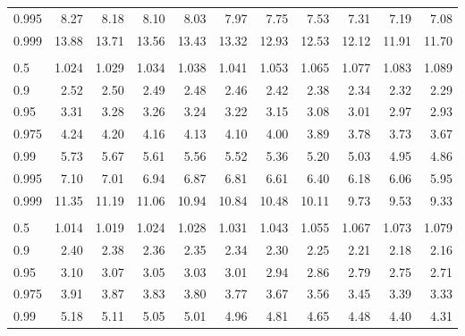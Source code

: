 \documentclass[]{article}
\begin{document}
\begin{table}[H]
\begin{tabular}{lrrrrrrrrrr}
\hspace{1em}0.995 & 8.27 & 8.18 & 8.10 & 8.03 & 7.97 & 7.75 & 7.53 & 7.31 & 7.19 & 7.08\\
\hspace{1em}0.999 & 13.88 & 13.71 & 13.56 & 13.43 & 13.32 & 12.93 & 12.53 & 12.12 & 11.91 & 11.70\\
\addlinespace[0.3em]
\multicolumn{11}{l}{\textbf{$k_2=8$}}\\
\hspace{1em}0.5 & 1.024 & 1.029 & 1.034 & 1.038 & 1.041 & 1.053 & 1.065 & 1.077 & 1.083 & 1.089\\
\hspace{1em}0.9 & 2.52 & 2.50 & 2.49 & 2.48 & 2.46 & 2.42 & 2.38 & 2.34 & 2.32 & 2.29\\
\hspace{1em}0.95 & 3.31 & 3.28 & 3.26 & 3.24 & 3.22 & 3.15 & 3.08 & 3.01 & 2.97 & 2.93\\
\hspace{1em}0.975 & 4.24 & 4.20 & 4.16 & 4.13 & 4.10 & 4.00 & 3.89 & 3.78 & 3.73 & 3.67\\
\hspace{1em}0.99 & 5.73 & 5.67 & 5.61 & 5.56 & 5.52 & 5.36 & 5.20 & 5.03 & 4.95 & 4.86\\
\hspace{1em}0.995 & 7.10 & 7.01 & 6.94 & 6.87 & 6.81 & 6.61 & 6.40 & 6.18 & 6.06 & 5.95\\
\hspace{1em}0.999 & 11.35 & 11.19 & 11.06 & 10.94 & 10.84 & 10.48 & 10.11 & 9.73 & 9.53 & 9.33\\
\addlinespace[0.3em]
\multicolumn{11}{l}{\textbf{$k_2=9$}}\\
\hspace{1em}0.5 & 1.014 & 1.019 & 1.024 & 1.028 & 1.031 & 1.043 & 1.055 & 1.067 & 1.073 & 1.079\\
\hspace{1em}0.9 & 2.40 & 2.38 & 2.36 & 2.35 & 2.34 & 2.30 & 2.25 & 2.21 & 2.18 & 2.16\\
\hspace{1em}0.95 & 3.10 & 3.07 & 3.05 & 3.03 & 3.01 & 2.94 & 2.86 & 2.79 & 2.75 & 2.71\\
\hspace{1em}0.975 & 3.91 & 3.87 & 3.83 & 3.80 & 3.77 & 3.67 & 3.56 & 3.45 & 3.39 & 3.33\\
\hspace{1em}0.99 & 5.18 & 5.11 & 5.05 & 5.01 & 4.96 & 4.81 & 4.65 & 4.48 & 4.40 & 4.31\\

\end{tabular}
\end{table}
\end{document}
